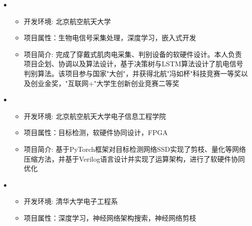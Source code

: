   \begin{itemize}[leftmargin=*]
    \item
      {\small
      \begin{itemize}
        \item 开发环境: 北京航空航天大学
        \item 项目属性：生物电信号采集处理，深度学习，嵌入式开发
        \item 项目简介: 完成了穿戴式肌肉电采集、判别设备的软硬件设计。本人负责项目企划、协调以及算法设计，基于决策树与LSTM算法设计了肌电信号判别算法。该项目参与国家"大创"，并获得北航"冯如杯"科技竞赛一等奖以及创业金奖，"互联网+"大学生创新创业竞赛二等奖
      \end{itemize}
      }
    \item
    {\small
    \begin{itemize}
      \item 开发环境: 北京航空航天大学电子信息工程学院
      \item 项目属性：目标检测，软硬件协同设计，FPGA
      \item 项目简介: 基于PyTorch框架对目标检测网络SSD实现了剪枝、量化等网络压缩方法，并基于Verilog语言设计并实现了运算架构，进行了软硬件协同优化
    \end{itemize}
    }
    \item
    {\small
    \begin{itemize}
      \item 开发环境: 清华大学电子工程系
      \item 项目属性：深度学习，神经网络架构搜索，神经网络剪枝

\end{itemize}}
\end{itemize}

